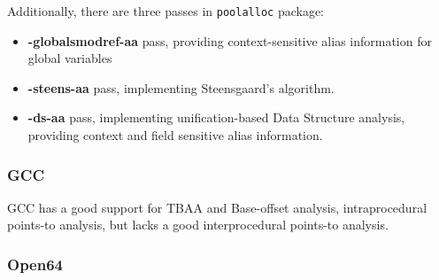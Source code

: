 Additionally, there are three passes in {\tt poolalloc} package:

\begin{itemize}
	\item {\bf -globalsmodref-aa} pass, providing context-sensitive alias
		information for global variables
	\item {\bf -steens-aa} pass, implementing Steensgaard's algorithm.
	\item {\bf -ds-aa} pass, implementing unification-based Data Structure
		analysis, providing context and field sensitive alias information.
\end{itemize}


\subsubsection{GCC}

GCC has a good support for TBAA and Base-offset analysis, intraprocedural
points-to analysis, but lacks a good interprocedural points-to analysis.

\subsubsection{Open64}

